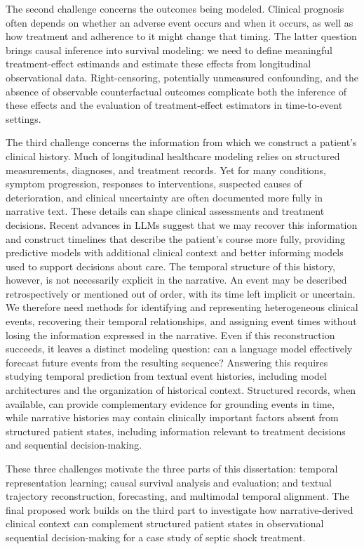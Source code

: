 The second challenge concerns the outcomes being modeled.
Clinical prognosis often depends on whether an adverse event occurs and when it occurs, as well as how treatment and adherence to it might change that timing.
The latter question brings causal inference into survival modeling: we need to define meaningful treatment-effect estimands and estimate these effects from longitudinal observational data.
Right-censoring, potentially unmeasured confounding, and the absence of observable counterfactual outcomes complicate both the inference of these effects and the evaluation of treatment-effect estimators in time-to-event settings.

The third challenge concerns the information from which we construct a patient's clinical history.
Much of longitudinal healthcare modeling relies on structured measurements, diagnoses, and treatment records.
Yet for many conditions, symptom progression, responses to interventions, suspected causes of deterioration, and clinical uncertainty are often documented more fully in narrative text.
These details can shape clinical assessments and treatment decisions.
Recent advances in LLMs suggest that we may recover this information and construct timelines that describe the patient's course more fully, providing predictive models with additional clinical context and better informing models used to support decisions about care.
The temporal structure of this history, however, is not necessarily explicit in the narrative.
An event may be described retrospectively or mentioned out of order, with its time left implicit or uncertain.
We therefore need methods for identifying and representing heterogeneous clinical events, recovering their temporal relationships, and assigning event times without losing the information expressed in the narrative.
Even if this reconstruction succeeds, it leaves a distinct modeling question: can a language model effectively forecast future events from the resulting sequence?
Answering this requires studying temporal prediction from textual event histories, including model architectures and the organization of historical context.
Structured records, when available, can provide complementary evidence for grounding events in time, while narrative histories may contain clinically important factors absent from structured patient states, including information relevant to treatment decisions and sequential decision-making.

These three challenges motivate the three parts of this dissertation: temporal representation learning; causal survival analysis and evaluation; and textual trajectory reconstruction, forecasting, and multimodal temporal alignment.
The final proposed work builds on the third part to investigate how narrative-derived clinical context can complement structured patient states in observational sequential decision-making for a case study of septic shock treatment.
